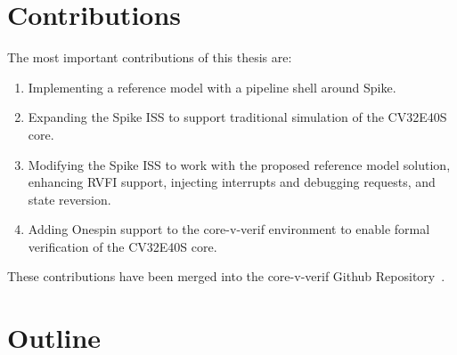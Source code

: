 



\section{Contributions}

The most important contributions of this thesis are:

\begin{enumerate}
    \item Implementing a reference model with a pipeline shell around Spike.
    \item Expanding the Spike ISS to support traditional simulation of the CV32E40S core.
    \item Modifying the Spike ISS to work with the proposed reference model solution, enhancing RVFI support, injecting interrupts and debugging requests, and state reversion.
    \item Adding Onespin support to the core-v-verif environment to enable formal verification of the CV32E40S core.
\end{enumerate}

These contributions have been merged into the core-v-verif Github Repository~\cite{openhwgroupOpenhwgroupCorevverif2023}.


\section{Outline}


